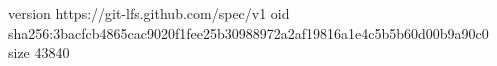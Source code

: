 version https://git-lfs.github.com/spec/v1
oid sha256:3bacfcb4865cac9020f1fee25b30988972a2af19816a1e4c5b5b60d00b9a90c0
size 43840
